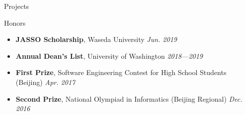 \documentclass{resume}
\begin{document}
\begin{rSection}{Projects}


	\end{rSection}
	\vspace{-5pt}
	

	\begin{rSection}{Honors}
		\begin{itemize}
			\setlength{\itemsep}{1pt}
			\setlength{\parskip}{0pt}
			\setlength{\parsep}{0pt}
			\item \textbf{JASSO Scholarship}, Waseda University \hfill {\em Jun. 2019}
			\item \textbf{Annual Dean's List}, University of Washington \hfill {\em 2018---2019}
			\item \textbf{First Prize}, Software Engineering Contest for High School Students (Beijing) \hfill {\em Apr. 2017}
			\item \textbf{Second Prize}, National Olympiad in Informatics (Beijing Regional) \hfill {\em Dec. 2016}
		\end{itemize}
	\end{rSection}
\end{document}
